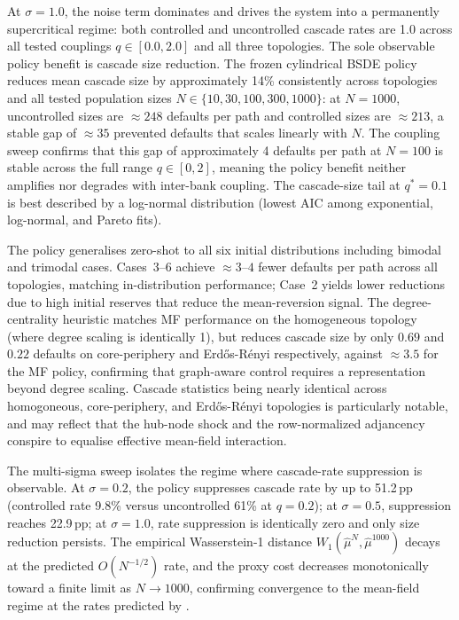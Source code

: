 \documentclass[11pt]{article}
\begin{document}
At $\sigma = 1.0$, the noise term dominates and drives the system into a permanently supercritical regime: both controlled and uncontrolled cascade rates are 1.0 across all tested couplings $q \in [0.0, 2.0]$ and all three topologies. The sole observable policy benefit is cascade size reduction. The frozen cylindrical BSDE policy reduces mean cascade size by approximately 14\% consistently across topologies and all tested population sizes $N \in \{10, 30, 100, 300, 1000\}$: at $N = 1000$, uncontrolled sizes are $\approx 248$ defaults per path and controlled sizes are $\approx 213$, a stable gap of $\approx 35$ prevented defaults that scales linearly with $N$. The coupling sweep confirms that this gap of approximately 4 defaults per path at $N = 100$ is stable across the full range $q \in [0, 2]$, meaning the policy benefit neither amplifies nor degrades with inter-bank coupling. The cascade-size tail at $q^* = 0.1$ is best described by a log-normal distribution (lowest AIC among exponential, log-normal, and Pareto fits).

The policy generalises zero-shot to all six initial distributions including bimodal and trimodal cases. Cases~3--6 achieve $\approx 3$--$4$ fewer defaults per path across all topologies, matching in-distribution performance; Case~2 yields lower reductions due to high initial reserves that reduce the mean-reversion signal. The degree-centrality heuristic matches MF performance on the homogeneous topology (where degree scaling is identically 1), but reduces cascade size by only $0.69$ and $0.22$ defaults on core-periphery and Erdős-Rényi respectively, against $\approx 3.5$ for the MF policy, confirming that graph-aware control requires a representation beyond degree scaling. Cascade statistics being nearly identical across homogoneous, core-periphery, and Erdős-Rényi topologies is particularly notable, and may reflect that the hub-node shock and the row-normalized adjancency conspire to equalise effective mean-field interaction.

The multi-sigma sweep isolates the regime where cascade-rate suppression is observable. At $\sigma = 0.2$, the policy suppresses cascade rate by up to 51.2\,pp (controlled rate 9.8\% versus uncontrolled 61\% at $q = 0.2$); at $\sigma = 0.5$, suppression reaches 22.9\,pp; at $\sigma = 1.0$, rate suppression is identically zero and only size reduction persists. The empirical Wasserstein-1 distance $W_1(\hat\mu^N, \hat\mu^{1000})$ decays at the predicted $O(N^{-1/2})$ rate, and the proxy cost decreases monotonically toward a finite limit as $N \to 1000$, confirming convergence to the mean-field regime at the rates predicted by \citet{fournier2015rate}.
\end{document}
